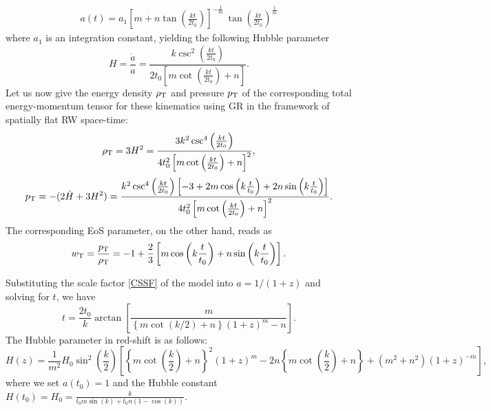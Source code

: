 \documentclass[11pt,a4paper]{article}
\begin{document}
\begin{eqnarray}\label{CSSF} 
a(t)=a_{1}\left[m+n \tan\left(\frac{kt}{2t_{0}}\right)\right]^{-\frac{1}{m}}\, {\tan\left(\frac{kt}{2t_{0}}\right)}^{\frac{1}{m}}
\end{eqnarray}
where $a_{1}$ is an integration constant, yielding the following Hubble parameter
\begin{equation}
\label{HPCSLDP}
H=\frac{\dot{a}}{a}=\frac{k \csc ^2\left(\frac{k t}{2 t_0}\right)}{2t_0\left[ m \cot \left(\frac{k t}{2 t_0}\right)+ n \right]}.
\end{equation}
Let us now give the energy density $\rho_{\rm T}$ and pressure $p_{\rm T}$ of the corresponding total energy-momentum tensor for these kinematics using GR in the framework of spatially flat RW space-time:
\begin{equation}
\rho_{\rm T}=3H^2=\frac{3k ^2\csc ^4\left(\frac{k t}{2 t_0}\right)}{4t_0^2\left[ m \cot \left(\frac{k t}{2 t_0}\right)+ n \right]^2},
\end{equation}
\begin{equation}
p_{\rm T}=-(2\dot{H}+3H^2)=\frac{k ^2\csc ^4\left(\frac{k t}{2 t_0}\right)\left[-3+2m\cos\left(k\frac{t}{t_0}\right)+2n\sin\left(k\frac{t}{t_0}\right)\right]}
{4t_0^2\left[ m \cot \left(\frac{k t}{2 t_0}\right)+ n \right]^2}.
\end{equation}
The corresponding EoS parameter, on the other hand, reads as
 \begin{equation}
w_{\rm T}=\frac{p_{\rm T}}{\rho_{\rm T}}=-1+\frac{2}{3}\left[m\cos\left(k\frac{t}{t_0}\right)+n\sin\left(k\frac{t}{t_0}\right)\right].
\end{equation}

Substituting the scale factor \eqref{CSSF} of the model into $a=1/(1+z)$ and solving for $t$, we have
\begin{equation}
t=\frac{2t_0}{k}\arctan\left[\frac{m}{\left\{m\cot(k/2)+n\right\}(1+z)^m-n}\right].
\end{equation}
The Hubble parameter in red-shift is as follows:
\begin{equation}
\label{eqn:HzRaw}
H(z)=\frac{1}{m^2}H_0 \sin ^2\left(\frac{k}{2}\right)  \left[ \left\{m \cot \left(\frac{k}{2}\right)+n\right\}^2(1+z)^m-2 n  
\left\{m\cot \left(\frac{k}{2}\right)+n\right\}+(m^2+n^2)(1+z)^{-m}\right],
\end{equation}
where we set $a(t_0)=1$ and the Hubble constant $H(t_0)=H_0=\frac{k}{t_{0}m\sin(k)+t_{0}n(1-\cos(k))}$.
\end{document}
